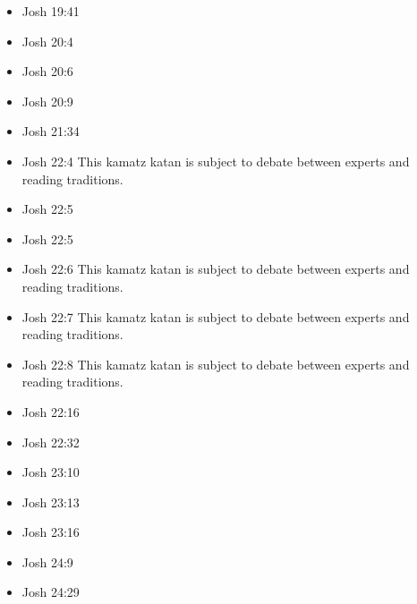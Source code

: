 \documentclass[14pt]{book}
\begin{document}
\begin{multicols}{2}
\begin{itemize}
			\item Josh 19:41
			
			\item Josh 20:4
			
			\item Josh 20:6
			
			\item Josh 20:9
			
			\item Josh 21:34
			
			\item Josh 22:4 This kamatz katan is subject to debate between experts and reading traditions.
			
			\item Josh 22:5
			
			\item Josh 22:5
			
			\item Josh 22:6 This kamatz katan is subject to debate between experts and reading traditions.
			
			\item Josh 22:7 This kamatz katan is subject to debate between experts and reading traditions.
			
			\item Josh 22:8 This kamatz katan is subject to debate between experts and reading traditions.
			
			\item Josh 22:16
			
			\item Josh 22:32
			
			\item Josh 23:10
			
			\item Josh 23:13
			
			\item Josh 23:16
			
			\item Josh 24:9
			
			\item Josh 24:29
			
			\end{itemize}\end{multicols}
		
\end{document}
